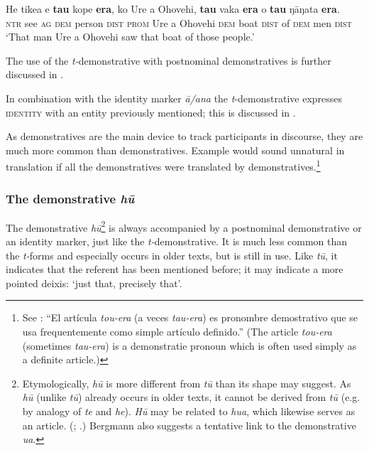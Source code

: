 \ea\label{ex:4.192}
\gll He tike{\ꞌ}a e \textbf{tau} kope \textbf{era}, ko Ure {\ꞌ}a Ohovehi, \textbf{tau} vaka \textbf{era}  o \textbf{tau} ŋāŋata \textbf{era}.\\
\textsc{ntr} see \textsc{ag} \textsc{dem} person \textsc{dist} \textsc{prom} Ure a Ohovehi \textsc{dem} boat \textsc{dist}  of \textsc{dem} men \textsc{dist}\\

\glt
‘That man Ure a Ohovehi saw that boat of those people.’ \textstyleExampleref{[Blx-3.070]}
\z

The use of the \textit{t-}demonstrative with postnominal demonstratives is further discussed in .

In combination with the identity marker \textit{{\ꞌ}ā}\textit{/{\ꞌ}ana} the \textit{t}{}-demonstrative expresses \textsc{identity} with an entity previously mentioned; this is discussed in .

As demonstratives are the main  device to track participants in discourse, they are much more common than  demonstratives. Example  would sound unnatural in translation if all the demonstratives were translated by demonstratives.\footnote{\label{fn:214}See \citet[21]{Englert1978}: “El artícula \textit{tou-era} (a veces \textit{tau-era}) es pronombre demostrativo que se usa frequentemente como simple artículo definido.” (The article \textit{tou-era} (sometimes \textit{tau-era}) is a demonstratie pronoun which is often used simply as a definite article.)} 

\subsubsection{The demonstrative \textit{hū}}\label{sec:4.6.2.2}
The demonstrative \textit{hū}\footnote{\label{fn:215}Etymologically, \textit{hū} is more different from \textit{tū} than its shape may suggest. As \textit{hū} (unlike \textit{tū}) already occurs in older texts, it cannot be derived from \textit{tū} (e.g. by analogy of \textit{te} and \textit{he}). \textit{Hū} may be related to  \textit{hua}, which likewise serves as an  article. (\citealt[62]{Cablitz2006}; \citealt[49]{Bergmann1963}.) Bergmann also suggests a tentative link to the  demonstrative \textit{ua}.} is always accompanied by a postnominal demonstrative or an identity marker, just like the \textit{t-}demonstrative. It is much less common than the \textit{t-}forms and especially occurs in older texts, but is still in use. Like \textit{tū}, it indicates that the referent has been mentioned before; it may indicate a more pointed deixis: ‘just that, precisely that’.

